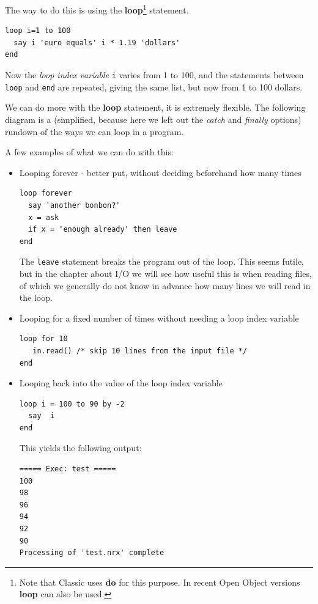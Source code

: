 {The way to do this is using the \textbf{loop}\footnote{Note that
  Classic \Rexx{} uses \textbf{do} for this purpose. In recent Open
  Object \Rexx{} versions
  \textbf{loop} can also be used.} statement.
\begin{lstlisting}[label=withoop,caption=With a loop]
loop i=1 to 100
  say i 'euro equals' i * 1.19 'dollars'
end
\end{lstlisting}
Now the \emph{loop index variable} \texttt{i} varies from 1 to 100,
and the statements between \texttt{loop} and \texttt{end} are
repeated, giving the same list, but now from 1 to 100 dollars.

We can do more with the \textbf{loop} statement, it is extremely
flexible. The following diagram is a (simplified, because here we left
out the \emph{catch} and \emph{finally} options) rundown of the ways
we can loop in a program.

A few examples of what we can do with this: 
\begin{itemize}
\item Looping forever - better put, without deciding beforehand how
  many times
\begin{lstlisting}[label=loopforever,caption=Loop Forever]
loop forever
  say 'another bonbon?'
  x = ask
  if x = 'enough already' then leave
end
\end{lstlisting}
The \texttt{leave} statement breaks the program out of the loop. This
seems futile, but in the chapter about I/O we will see how useful this
is when reading files, of which we generally do not know in advance
how many lines we will read in the loop.

\item Looping for a fixed number of times without needing a loop index
  variable
\begin{lstlisting}[label=loopfixed,caption=Loop for a fixed number of
  times without loop index variable]
loop for 10
   in.read() /* skip 10 lines from the input file */
end
\end{lstlisting}
\item Looping back into the value of the loop index variable
\begin{lstlisting}[label=loopforever,caption=Loop Forever]
loop i = 100 to 90 by -2
  say  i
end
\end{lstlisting}
This yields the following output:
\begin{verbatim}
===== Exec: test =====
100
98
96
94
92
90
Processing of 'test.nrx' complete
\end{verbatim}
\end{itemize}

}
